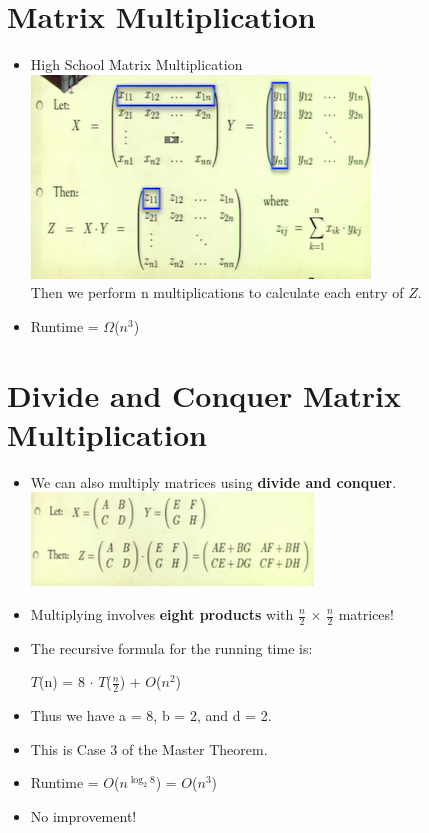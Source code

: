 \documentclass[12pt]{article}
\begin{document}
\section{Matrix Multiplication}
\renewcommand{\labelitemii}{$\circ$}
\renewcommand{\labelitemiii}{$\cdot$}
\renewcommand{\labelitemiii}{$\rightarrow$}
\begin{itemize}
\item High School Matrix Multiplication\\
\includegraphics{lecture45}\\
Then we perform n multiplications to calculate each entry of $Z$.
\item Runtime = $\Omega$($n^3$)
\end{itemize}

\section{Divide and Conquer Matrix Multiplication}
\renewcommand{\labelitemii}{$\circ$}
\renewcommand{\labelitemiii}{$\cdot$}
\renewcommand{\labelitemiii}{$\rightarrow$}
\begin{itemize}
\item We can also multiply matrices using \textbf{divide and conquer}.\\
\includegraphics{lecture46}
\item Multiplying involves \textbf{eight products} with $\frac{n}{2}$ $\times$ $\frac{n}{2}$ matrices!
\item The recursive formula for the running time is:
	
	\hspace*{\fill} $T$(n) = 8 $\cdot$ $T$($\frac{n}{2}$) + $O$($n^2$)\hspace*{\fill} 
	
	\item Thus we have a = 8, b = 2, and d = 2.
	\item This is Case 3 of the Master Theorem.
	\item Runtime = $O$($n^{\log_2 8}$) = $O$($n^3$)
	\item No improvement!
\end{itemize}
\end{document}
